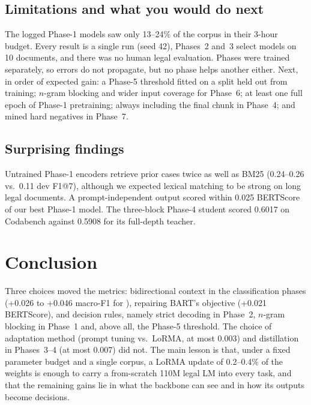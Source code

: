\documentclass[11pt, oneside]{article}
\newcommand{\tsc}[1]{\texttt{\detokenize{#1}}}
\begin{document}
\subsection{Limitations and what you would do next}
The logged Phase-1 models saw only 13--24\% of the corpus in their 3-hour budget. Every result is a single run (seed 42), Phases~2 and~3 select models on 10 documents, and there was no human legal evaluation. Phases were trained separately, so errors do not propagate, but no phase helps another either. Next, in order of expected gain: a Phase-5 threshold fitted on a split held out from training; $n$-gram blocking and wider input coverage for Phase~6; at least one full epoch of Phase-1 pretraining; always including the final chunk in Phase~4; and mined hard negatives in Phase~7.

\subsection{Surprising findings}
Untrained Phase-1 encoders retrieve prior cases twice as well as BM25 (0.24--0.26 vs.\ 0.11 dev F1@7), although we expected lexical matching to be strong on long legal documents. A prompt-independent output scored within 0.025 BERTScore of our best Phase-1 model. The three-block Phase-4 student scored 0.6017 on Codabench against 0.5908 for its full-depth \tsc{llama} teacher.

\section{Conclusion}
Three choices moved the metrics: bidirectional context in the classification phases (+0.026 to +0.046 macro-F1 for \tsc{prefixlm}), repairing BART's objective (+0.021 BERTScore), and decision rules, namely strict decoding in Phase~2, $n$-gram blocking in Phase~1 and, above all, the Phase-5 threshold. The choice of adaptation method (prompt tuning vs.\ LoRMA, at most 0.003) and distillation in Phases~3--4 (at most 0.007) did not. The main lesson is that, under a fixed parameter budget and a single corpus, a LoRMA update of 0.2--0.4\% of the weights is enough to carry a from-scratch 110M legal LM into every task, and that the remaining gains lie in what the backbone can see and in how its outputs become decisions.

\clearpage
\end{document}
